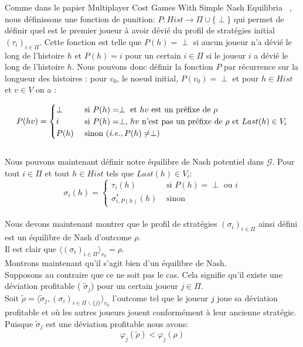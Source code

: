 \begin{demonstration}
\begin{itemize}
	Comme dans le papier \og Multiplayer Cost Games With Simple Nash Equilibria \fg~\cite{DBLP:conf/lfcs/BrihayePS13}, nous définissons une fonction de punition: $P : Hist \rightarrow \Pi\cup \{ \perp \}$ qui permet de définir quel est le premier joueur à avoir dévié du profil de stratégies initial $(\tau_i)_{i\in\Pi}$. Cette fonction est telle que $P(h) = \perp$ si aucun joueur n'a dévié le long de l'histoire $h$ et $P(h) = i$ pour un certain $i \in \Pi$ si le joueur $i$ a dévié le long de l'histoire $h$. Nous pouvons donc définir la fonction $P$ par récurrence sur la longueur des histoires : pour $v_0$, le noeud initial, $P(v_0) = \perp$  et pour $h \in Hist$ et $v\in V$ on a :
	
	$$
	P(hv) = \begin{cases}
			\perp & \text{ si } P(h) = \perp \text{ et } hv \text{ est un préfixe de } \rho \\
			i & \text{ si } P(h) = \perp ,\, hv \text{ n'est pas un préfixe de }\rho \text{ et } Last(h)\in V_i\\
			P(h) & \text{ sinon (\emph{i.e.,}}\, P(h)\neq \perp) \end{cases}
	$$\\
	
	Nous pouvons maintenant définir notre équilibre de Nash potentiel dans $\mathcal{G}$. Pour tout $i\in \Pi$ et tout $h\in Hist$ tels que $Last(h)\in V_i$:
	$$\sigma_i(h)= \begin{cases}
					\tau_i(h) & \text{ si }P(h)= \perp \text{ ou }i \\
					\sigma^*_{i,P(h)}(h) & \text{ sinon }\end{cases}$$\\
					
	Nous devons maintenant montrer que le profil de stratégies $(\sigma_i)_{i\in\Pi}$ ainsi défini est un équilibre de Nash d'outcome $\rho$.\\
	Il est clair que $\langle (\sigma_i)_{i\in\Pi} \rangle_{v_0} = \rho$.\\
	Montrons maintenant qu'il s'agit bien d'un équilibre de Nash.\\
	\noindent Supposons au contraire que ce ne soit pas le cas. Cela signifie qu'il existe une déviation profitable ( $\tilde{\sigma}_j$) pour un certain joueur $j \in\Pi$.\\ 
		\noindent Soit $\tilde{\rho} = \langle \tilde{\sigma}_j , (\sigma_i)_{i \in \Pi \backslash \{j \}} \rangle_{v_0}$ l'outcome tel que le joueur $j$ joue sa déviation profitable et où les autres joueurs jouent conformément à leur ancienne stratégie.
		Puisque $\tilde{\sigma}_j$ est une déviation profitable nous avons: 
		\begin{equation}
			\label{eq:questEq4}
			\varphi_j(\tilde{\rho}) < \varphi_j(\rho)
		\end{equation}
		

\end{itemize}
\end{demonstration}

